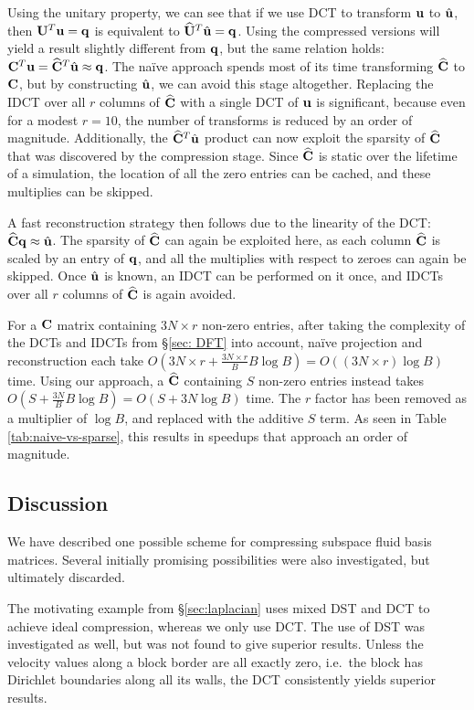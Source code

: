 Using the unitary property, we can see that if we use DCT to transform $\mathbf{u}$ to $\hat{\mathbf{u}}$, then $\mathbf{U}^T\mathbf{u} = \mathbf{q}$ is equivalent to $\widehat{\mathbf{U}}^T\hat{\mathbf{u}} = \mathbf{q}$. Using the compressed versions will yield a result slightly different from $\mathbf{q}$, but the same relation holds: $\mathbf{C}^T\mathbf{u} = \widehat{\mathbf{C}}^T\hat{\mathbf{u}} \approx \mathbf{q}$. The na\"{i}ve approach spends most of its time transforming $\widehat{\mathbf{C}}$ to $\mathbf{C}$, but by constructing $\hat{\mathbf{u}}$, we can avoid this stage altogether. Replacing the IDCT over all $r$ columns of $\widehat{\mathbf{C}}$ with a single DCT of $\mathbf{u}$ is significant, because even for a modest $r = 10$, the number of transforms is reduced by an order of magnitude. Additionally, the $\widehat{\mathbf{C}}^T\hat{\mathbf{u}}$ product can now exploit the sparsity of $\widehat{\mathbf{C}}$ that was discovered by the compression stage. Since $\widehat{\mathbf{C}}$ is static over the lifetime of a simulation, the location of all the zero entries can be cached, and these multiplies can be skipped. 

A fast reconstruction strategy then follows due to the linearity of the DCT: $\widehat{\mathbf{C}}\mathbf{q} \approx \hat{\mathbf{u}}$. The sparsity of $\widehat{\mathbf{C}}$ can again be exploited here, as each column $\widehat{\mathbf{C}}$ is scaled by an entry of $\mathbf{q}$, and all the multiplies with respect to zeroes can again be skipped. Once $\hat{\mathbf{u}}$ is known, an IDCT can be performed on it once, and IDCTs over all $r$ columns of $\widehat{\mathbf{C}}$ is again avoided.

For a $\mathbf{C}$ matrix containing ${3N \times r}$ non-zero entries, after taking the complexity of the DCTs and IDCTs from \S\ref{sec: DFT} into account, na\"{i}ve projection and reconstruction each take $O\left(3N \times r +\frac{3N \times r}{B} B \log B\right) = O\left((3N \times r)\log B\right)$ time. Using our approach, a $\widehat{\mathbf{C}}$ containing $S$ non-zero entries instead takes $O\left(S + \frac{3N}{B} B \log B\right) = O\left(S + 3N \log B\right)$ time. The $r$ factor has been removed as a multiplier of $\log B$, and replaced with the additive $S$ term. As seen in Table \ref{tab:naive-vs-sparse}, this results in speedups that approach an order of magnitude.

\subsection{Discussion}

We have described one possible scheme for compressing subspace fluid basis matrices. Several initially promising possibilities were also investigated, but ultimately discarded.

The motivating example from \S\ref{sec:laplacian} uses mixed DST and DCT to achieve ideal compression, whereas we only use DCT. The use of DST was investigated as well, but was not found to give superior results. Unless the velocity values along a block border are all exactly zero, i.e.~the block has Dirichlet boundaries along all its walls, the DCT consistently yields superior results.


